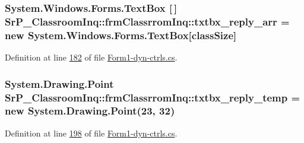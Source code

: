 \hypertarget{class_sr_p___classroom_inq_1_1frm_classrrom_inq_a3411157caafbe33c31a364fafd548afb}{
\subsubsection[{txtbx\-\_\-reply\-\_\-arr}]{\setlength{\rightskip}{0pt plus 5cm}\-System.\-Windows.\-Forms.\-Text\-Box \mbox{[}$\,$\mbox{]} {\bf \-Sr\-P\-\_\-\-Classroom\-Inq\-::frm\-Classrrom\-Inq\-::txtbx\-\_\-reply\-\_\-arr} = new \-System.\-Windows.\-Forms.\-Text\-Box\mbox{[}{\bf class\-Size}\mbox{]}}}
\label{class_sr_p___classroom_inq_1_1frm_classrrom_inq_a3411157caafbe33c31a364fafd548afb}


\-Definition at line \hyperlink{_form1-dyn-ctrls_8cs_source_l00182}{182} of file \hyperlink{_form1-dyn-ctrls_8cs_source}{\-Form1-\/dyn-\/ctrls.\-cs}.

\hypertarget{class_sr_p___classroom_inq_1_1frm_classrrom_inq_a0b175596cb83997b38795ee916c978f1}{
\subsubsection[{txtbx\-\_\-reply\-\_\-temp}]{\setlength{\rightskip}{0pt plus 5cm}\-System.\-Drawing.\-Point {\bf \-Sr\-P\-\_\-\-Classroom\-Inq\-::frm\-Classrrom\-Inq\-::txtbx\-\_\-reply\-\_\-temp} = new \-System.\-Drawing.\-Point(23, 32)}}
\label{class_sr_p___classroom_inq_1_1frm_classrrom_inq_a0b175596cb83997b38795ee916c978f1}


\-Definition at line \hyperlink{_form1-dyn-ctrls_8cs_source_l00198}{198} of file \hyperlink{_form1-dyn-ctrls_8cs_source}{\-Form1-\/dyn-\/ctrls.\-cs}.

